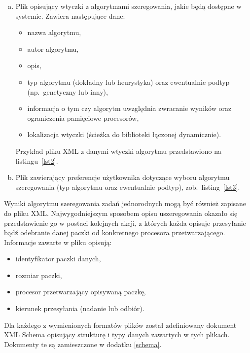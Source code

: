 \begin{enumerate}[a)]
	\item Plik opisujący wtyczki z algorytmami szeregowania, jakie będą dostępne w systemie. Zawiera następujące dane:
	\begin{itemize}
		\item nazwa algorytmu,
		\item autor algorytmu,
		\item opis,
		\item typ algorytmu (dokładny lub heurystyka) oraz ewentualnie podtyp (np.~genetyczny lub inny),
		\item informacja o tym czy algorytm uwzględnia zwracanie wyników oraz ograniczenia pamięciowe procesorów,
		\item lokalizacja wtyczki (ścieżka do biblioteki łączonej dynamicznie).
	\end{itemize}
    Przykład pliku XML z danymi wtyczki algorytmu przedstawiono na listingu~\vref{lst2}.
    
	\item Plik zawierający preferencje użytkownika dotyczące wyboru algorytmu szeregowania (typ algorytmu oraz ewentualnie podtyp),
    zob.~listing~\vref{lst3}.
\end{enumerate}

\bigskip%
Wyniki algorytmu szeregowania zadań jednorodnych mogą być również zapisane do pliku XML. Najwygodniejszym sposobem opisu uszeregowania 
okazało się przedstawienie go w postaci kolejnych akcji, z których każda opisuje przesyłanie bądź odebranie danej paczki od konkretnego procesora 
przetwarzającego. Informacje zawarte w pliku opisują:
\begin{itemize}
	\item identyfikator paczki danych,
	\item rozmiar paczki,
	\item procesor przetwarzający opisywaną paczkę,
	\item kierunek przesyłania (nadanie lub odbiór).
\end{itemize}

Dla każdego z wymienionych formatów plików został zdefiniowany dokument XML Schema opisujący strukturę i typy danych zawartych w tych plikach. 
Dokumenty te są zamieszczone w dodatku \vref{schema}.

